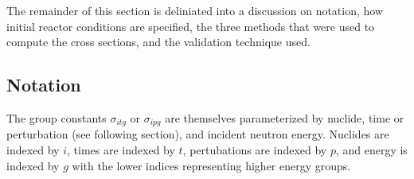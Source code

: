 The remainder of this section is deliniated into a discussion on notation, how initial 
reactor conditions are specified, the three methods that were used to compute the
cross sections, and the validation technique used.

\subsection{Notation}
The group constants $\sigma_{itg}$ or $\sigma_{ipg}$ are themselves parameterized by nuclide, 
time or perturbation (see following section), and  incident neutron energy.  Nuclides are indexed by 
$i$, times are indexed by $t$, pertubations are indexed by $p$, and energy is indexed by $g$ with the 
lower indices representing higher energy groups.

